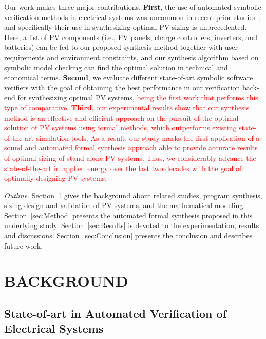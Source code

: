 \documentclass[review]{elsarticle}
\begin{document}
Our work makes three major contributions. \textbf{First}, the use of automated 
symbolic verification methods in electrical systems was uncommon in recent 
prior studies~\cite{abs-1811-09438}, and specifically their use in synthesizing 
optimal PV sizing is unprecedented. Here, a list of PV components (i.e., PV panels, 
charge controllers, inverters, and batteries) can be fed to our proposed synthesis 
method together with user requirements and environment constraints, 
and our synthesis algorithm based on symbolic model checking 
can find the optimal solution in technical and economical terms. 
\textbf{Second}, we evaluate different state-of-art symbolic software 
verifiers with the goal of obtaining the best performance in our verification 
back-end for synthesizing optimal PV systems, \textcolor{red}{being the first work that performs this type of comparative.}
\textcolor{red}{\textbf{Third}, our experimental results show that our synthesis method is an effective and efficient approach 
on the pursuit of the optimal solution of PV systems using formal methods, which outperforms 
existing state-of-the-art simulation tools. As a result, our study marks the first application of a sound
and automated formal synthesis approach able to provide accurate results of optimal sizing of stand-alone PV systems.
Thus, we considerably advance the state-of-the-art in applied energy over the last two decades 
with the goal of optimally designing PV systems.}

\noindent \textit{Outline}. Section~\ref{sec:Background} gives the background about related studies, 
program synthesis, sizing design and validation of PV systems, and the mathematical modeling. 
Section~\ref{sec:Method} presents the automated formal synthesis proposed 
in this underlying study. Section~\ref{sec:Results} is devoted to the experimentation, 
results and discussions. Section~\ref{sec:Conclusion} presents the conclusion and describes future work.
%
\section{BACKGROUND}
\label{sec:Background}

\subsection{State-of-art in Automated Verification of Electrical Systems}
\end{document}
